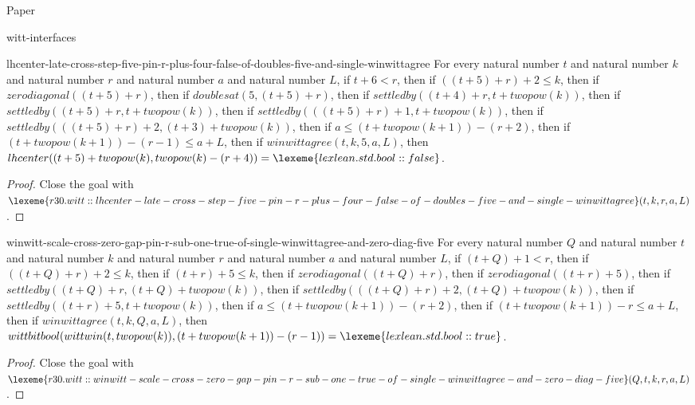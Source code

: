 \begin{lexlean}{Paper}
\begin{section}{witt-interfaces}
  \begin{theorem}{lhcenter-late-cross-step-five-pin-r-plus-four-false-of-doubles-five-and-single-winwittagree}
  For every natural number \(t\) and natural number \(k\) and natural number \(r\) and natural number \(a\) and natural number \(L\), if \(t + 6 < r\), then if \(((t + 5) + r) + 2 ≤ k\), then if \(zerodiagonal((t + 5) + r)\), then if \(doublesat(5, (t + 5) + r)\), then if \(settledby((t + 4) + r, t + twopow(k))\), then if \(settledby((t + 5) + r, t + twopow(k))\), then if \(settledby(((t + 5) + r) + 1, t + twopow(k))\), then if \(settledby(((t + 5) + r) + 2, (t + 3) + twopow(k))\), then if \(a ≤ (t + twopow(k + 1)) - (r + 2)\), then if \((t + twopow(k + 1)) - (r - 1) ≤ a + L\), then if \(winwittagree(t, k, 5, a, L)\), then \(lhcenter((t + 5) + twopow(k), twopow(k) - (r + 4)) = \lexeme{lexlean.std.bool::false}\).
  \begin{proof}
  Close the goal with \(\lexeme{r30.witt::lhcenter-late-cross-step-five-pin-r-plus-four-false-of-doubles-five-and-single-winwittagree}(t, k, r, a, L)\).
  \end{proof}
  \end{theorem}

  \begin{theorem}{winwitt-scale-cross-zero-gap-pin-r-sub-one-true-of-single-winwittagree-and-zero-diag-five}
  For every natural number \(Q\) and natural number \(t\) and natural number \(k\) and natural number \(r\) and natural number \(a\) and natural number \(L\), if \((t + Q) + 1 < r\), then if \(((t + Q) + r) + 2 ≤ k\), then if \((t + r) + 5 ≤ k\), then if \(zerodiagonal((t + Q) + r)\), then if \(zerodiagonal((t + r) + 5)\), then if \(settledby((t + Q) + r, (t + Q) + twopow(k))\), then if \(settledby(((t + Q) + r) + 2, (t + Q) + twopow(k))\), then if \(settledby((t + r) + 5, t + twopow(k))\), then if \(a ≤ (t + twopow(k + 1)) - (r + 2)\), then if \((t + twopow(k + 1)) - r ≤ a + L\), then if \(winwittagree(t, k, Q, a, L)\), then \(wittbitbool(wittwin(t, twopow(k)), (t + twopow(k + 1)) - (r - 1)) = \lexeme{lexlean.std.bool::true}\).
  \begin{proof}
  Close the goal with \(\lexeme{r30.witt::winwitt-scale-cross-zero-gap-pin-r-sub-one-true-of-single-winwittagree-and-zero-diag-five}(Q, t, k, r, a, L)\).
  \end{proof}
  \end{theorem}


\end{section}
\end{lexlean}
